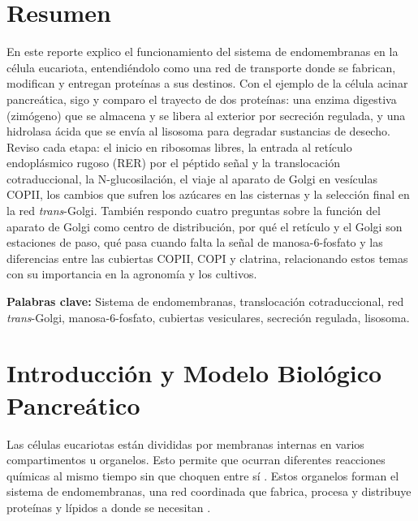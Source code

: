 \documentclass[12pt,spanish,letterpaper,oneside]{article}
\begin{document}
\hypersetup{pageanchor=false}
\begingroup
\fontsize{14}{17}\selectfont
\renewcommand{\Huge}{\fontsize{14}{17}\selectfont\bfseries}
\renewcommand{\large}{\fontsize{14}{17}\selectfont}
\templatePortrait
\clearpage
\endgroup
\hypersetup{pageanchor=true}
\templatePagecfg
\singlespacing
\setlength{\tabcolsep}{6pt}
\renewcommand{\arraystretch}{1.18}

\section*{Resumen}
En este reporte explico el funcionamiento del sistema de endomembranas en la célula eucariota, entendiéndolo como una red de transporte donde se fabrican, modifican y entregan proteínas a sus destinos. Con el ejemplo de la célula acinar pancreática, sigo y comparo el trayecto de dos proteínas: una enzima digestiva (zimógeno) que se almacena y se libera al exterior por secreción regulada, y una hidrolasa ácida que se envía al lisosoma para degradar sustancias de desecho. Reviso cada etapa: el inicio en ribosomas libres, la entrada al retículo endoplásmico rugoso (RER) por el péptido señal y la translocación cotraduccional, la N-glucosilación, el viaje al aparato de Golgi en vesículas COPII, los cambios que sufren los azúcares en las cisternas y la selección final en la red \textit{trans}-Golgi. También respondo cuatro preguntas sobre la función del aparato de Golgi como centro de distribución, por qué el retículo y el Golgi son estaciones de paso, qué pasa cuando falta la señal de manosa-6-fosfato y las diferencias entre las cubiertas COPII, COPI y clatrina, relacionando estos temas con su importancia en la agronomía y los cultivos.

\vspace{0.2cm}
\noindent\textbf{Palabras clave:} Sistema de endomembranas, translocación cotraduccional, red \textit{trans}-Golgi, manosa-6-fosfato, cubiertas vesiculares, secreción regulada, lisosoma.

\section{Introducción y Modelo Biológico Pancreático}
Las células eucariotas están divididas por membranas internas en varios compartimentos u organelos. Esto permite que ocurran diferentes reacciones químicas al mismo tiempo sin que choquen entre sí \parencite{alberts2022molecular}. Estos organelos forman el sistema de endomembranas, una red coordinada que fabrica, procesa y distribuye proteínas y lípidos a donde se necesitan \parencite{lodish2021molecular, fortoul2020histologia}.
\end{document}
